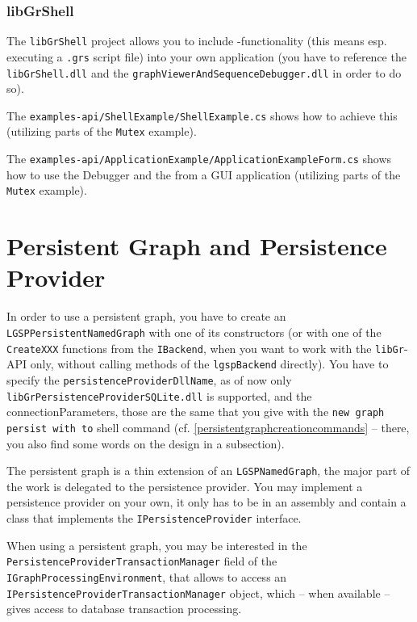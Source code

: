 \subsubsection*{libGrShell}
The \texttt{libGrShell} project allows you to include \GrShell{}-functionality (this means esp. executing a \texttt{.grs} script file) into your own application (you have to reference the \texttt{libGrShell.dll} and the \texttt{graphViewerAndSequenceDebugger.dll} in order to do so).

The \texttt{examples-api/ShellExample/ShellExample.cs} shows how to achieve this (utilizing parts of the \texttt{Mutex} example).

The \texttt{examples-api/ApplicationExample/ApplicationExampleForm.cs} shows how to use the Debugger and the \GrShell{} from a GUI application (utilizing parts of the \texttt{Mutex} example).


\section{Persistent Graph and Persistence Provider}
In order to use a persistent graph, you have to create an \texttt{LGSPPersistentNamedGraph} with one of its constructors (or with one of the \texttt{CreateXXX} functions from the \texttt{IBackend}, when you want to work with the \texttt{libGr}-API only, without calling methods of the \texttt{lgspBackend} directly).
You have to specify the \texttt{persistenceProviderDllName}, as of now only \texttt{libGr\-Persistence\-Provider\-SQLite.dll} is supported, and the connectionParameters, those are the same that you give with the \texttt{new graph persist with to} shell command (cf. \ref{persistentgraphcreationcommands} -- there, you also find some words on the design in a subsection).

The persistent graph is a thin extension of an \texttt{LGSPNamedGraph}, the major part of the work is delegated to the persistence provider.
You may implement a persistence provider on your own, it only has to be in an assembly and contain a class that implements the \texttt{IPersistenceProvider} interface.

When using a persistent graph, you may be interested in the \texttt{Persistence\-Provider\-Transaction\-Manager} field of the \texttt{IGraph\-Processing\-Environment}, that allows to access an \texttt{IPersistence\-Provider\-Transaction\-Manager} object, which -- when available -- gives access to database transaction processing.



